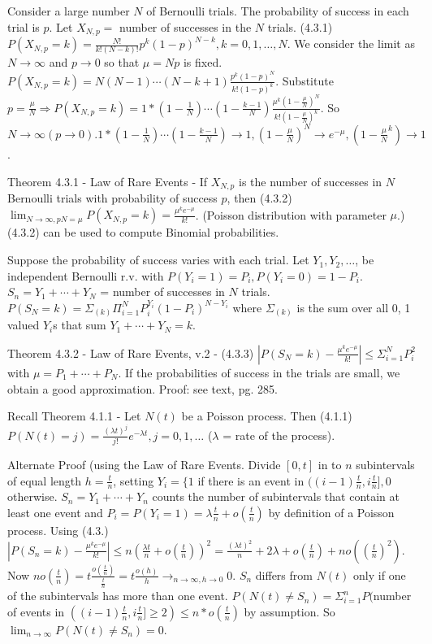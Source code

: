 \documentclass{article}
\begin{document}
Consider a large number $N$ of Bernoulli trials. The probability of success in each trial is $p$. Let $X_{N,p} =$ number of successes in the $N$ trials. (4.3.1) $P(X_{N,p} = k) = \frac{N!}{k!(N-k)!} p^k (1-p)^{N-k}, k = 0, 1, \dots, N$. We consider the limit as $N \rightarrow \infty$ and $p \rightarrow 0$ so that $\mu = Np$ is fixed. $P(X_{N,p} = k) = N(N-1) \cdots (N-k+1) \frac{p^k (1-p)^N}{k! (1-p)^k}$. Substitute $p = \frac{\mu}{N} \Rightarrow P(X_{N,p} = k) = 1 * (1 - \frac{1}{N}) \cdots (1 - \frac{k-1}{N}) \frac{\mu^k (1 - \frac{\mu}{N})^N}{k!(1-\frac{\mu}{N})^k}$. So $N \rightarrow \infty (p \rightarrow 0). 1 * (1 - \frac{1}{N}) \cdots (1 - \frac{k-1}{N}) \rightarrow 1, (1 - \frac{\mu}{N})^N \rightarrow e^{-\mu}, (1 - \frac{\mu}{N}^k) \rightarrow 1$.

Theorem 4.3.1 - Law of Rare Events - If $X_{N,p}$ is the number of successes in $N$ Bernoulli trials with probability of success $p$, then (4.3.2) $\lim_{N \rightarrow \infty, pN = \mu} P(X_{N,p} = k) = \frac{\mu^k e^{-\mu}}{k!}$. (Poisson distribution with parameter $\mu$.) (4.3.2) can be used to compute Binomial probabilities.

Suppose the probability of success varies with each trial. Let $Y_1, Y_2, \dots$, be independent Bernoulli r.v. with $P(Y_i = 1) = P_i, P(Y_i=0) = 1-P_i$. $S_n = Y_1 + \cdots + Y_N$ = number of successes in $N$ trials. $P(S_N = k) = \Sigma_{(k)} \Pi_{i=1}^N P_i^{Y_i} (1-P_i)^{N-Y_i}$ where $\Sigma_{(k)}$ is the sum over  all 0, 1 valued $Y_i$s that sum $Y_1 + \cdots + Y_N = k$.

Theorem 4.3.2 - Law of Rare Events, v.2 - (4.3.3) $|P(S_N=k) - \frac{\mu^k e^{-\mu}}{k!} | \le \Sigma_{i=1}^N P_i^2$ with $\mu = P_1 + \cdots + P_N$. If the probabilities of success in the trials are small, we obtain a good approximation. Proof: see text, pg. 285.

Recall Theorem 4.1.1 - Let $N(t)$ be a Poisson process. Then (4.1.1) $P(N(t) = j) = \frac{(\lambda t)^j}{j!} e^{-\lambda t}, j = 0, 1, \dots$ ($\lambda$ = rate of the process).

Alternate Proof (using the Law of Rare Events. Divide $[0, t]$ in to $n$ subintervals of equal length $h = \frac{t}{n}$, setting $Y_i = \{1$ if there is an event in $((i-1)\frac{t}{n}, i \frac{t}{n}], 0$ otherwise. $S_n = Y_1 + \cdots + Y_n$ counts the number of subintervals that contain at least one event and $P_i = P(Y_i = 1) = \lambda \frac{t}{n} + o(\frac{t}{n})$ by definition of a Poisson process. Using (4.3.) $|P(S_n = k) - \frac{\mu^k e^{-\mu}}{k!}| \le n (\frac{\lambda t}{n} + o(\frac{t}{n}))^2 = \frac{(\lambda t)^2}{n} + 2 \lambda + o(\frac{t}{n}) + n o((\frac{t}{n})^2)$. Now $n o(\frac{t}{n}) = t \frac{o (\frac{t}{n})}{\frac{t}{n}} = t \frac{o(h)}{h} \rightarrow_{n \rightarrow \infty, h \rightarrow 0} 0$. $S_n$ differs from $N(t)$ only if one of the subintervals has more than one event. $P(N(t) \ne S_n) = \Sigma_{i=1}^n P($number of events in $((i-1)\frac{t}{n}, i \frac{t}{n}] \ge 2 ) \le n * o (\frac{t}{n})$ by assumption. So $\lim_{n \rightarrow \infty} P(N(t) \ne S_n) = 0$.
\end{document}
